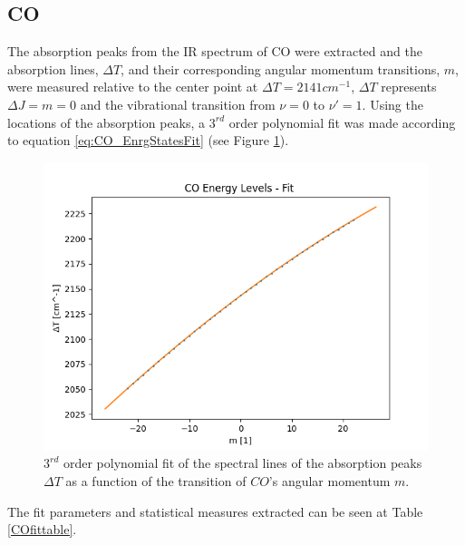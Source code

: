 \documentclass[reprint,amsmath,amssymb,aps, prl,superscriptaddress]{revtex4-2}
\begin{document}
\subsection{CO}
The absorption peaks from the IR spectrum of CO were extracted and the absorption lines,
$\Delta T$, 
and their corresponding angular momentum transitions,
$m$,
were measured relative to the center point at $\Delta T=2141 cm^{-1}$, $\Delta T$ represents $\Delta J = m = 0 $ and the vibrational transition from $\nu =0$ to $\nu' =1$. Using the locations of the absorption peaks,
a $3^{rd}$ order polynomial fit was made according to equation \ref{eq:CO_EnrgStatesFit} (see Figure \ref{fig:COPolynomialfit}).
\begin{figure}[H]
    \includegraphics[width=\linewidth]{Images/polynomial_3_fitting.png}
    \caption{$3^{rd}$ order polynomial fit of the spectral lines of the absorption peaks $\Delta T$ as a function of the transition of $CO$'s
    angular momentum $m$. }
    \label{fig:COPolynomialfit}
    \centering
\end{figure}
The fit parameters and statistical measures extracted can be seen at Table \ref{COfittable}. 
\end{document}
